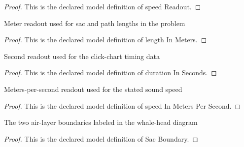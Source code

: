 \begin{proof}
  This is the declared model definition of speed Readout.
\end{proof}
\begin{definition}
  \label{def:physics:phyx-mini-0321:phyxminiproblems-problemphyxmini0321-lengthinmeters}
  Meter readout used for sac and path lengths in the problem
\end{definition}
\begin{proof}
  This is the declared model definition of length In Meters.
\end{proof}
\begin{definition}
  \label{def:physics:phyx-mini-0321:phyxminiproblems-problemphyxmini0321-durationinseconds}
  Second readout used for the click-chart timing data
\end{definition}
\begin{proof}
  This is the declared model definition of duration In Seconds.
\end{proof}
\begin{definition}
  \label{def:physics:phyx-mini-0321:phyxminiproblems-problemphyxmini0321-speedinmeterspersecond}
  Meters-per-second readout used for the stated sound speed
\end{definition}
\begin{proof}
  This is the declared model definition of speed In Meters Per Second.
\end{proof}
\begin{definition}
  \label{def:physics:phyx-mini-0321:phyxminiproblems-problemphyxmini0321-sacboundary}
  The two air-layer boundaries labeled in the whale-head diagram
\end{definition}
\begin{proof}
  This is the declared model definition of Sac Boundary.
\end{proof}
